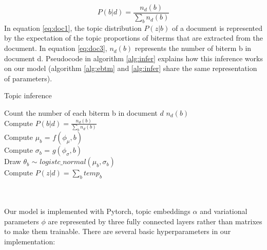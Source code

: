 \begin{equation}
    P(b|d) = \frac{n_d(b)}{\sum_bn_d(b)}
\label{eq:doc3}
\end{equation}
In equation \ref{eq:doc1}, the topic distribution $P(z|b)$ of a document is represented by the expectation of the topic proportions of biterms that are extracted from the document. In equation \ref{eq:doc3}, $n_d(b)$ represents the number of biterm b in document d. Pseudocode in algorithm \ref{alg:infer} explains how this inference works on our model (algorithm \ref{alg:ebtm} and \ref{alg:infer} share the same representation of parameters).
\begin{algorithm}[!htbp]
    \caption{Topic inference}
    \label{alg:infer}
    \LinesNumbered
    Count the number of each biterm b in document $d$ $n_d(b)$\\
    {
        Compute $P(b|d) = \frac{n_d(b)}{\sum_bn_d(b)}$\\
        Compute $\mu_b$ = $f(\phi_{\mu},b)$\\
        Compute $\sigma_b$ = $g(\phi_{\sigma},b)$\\ 
        Draw $\theta_b$ $\sim$ $logistc\_normal(\mu_b,\sigma_b)$\\
    }
    {
        Compute $P(z|d) = \sum_b temp_b$
    }
\end{algorithm}
\\\\Our model is implemented with Pytorch, topic embeddings $\alpha$ and variational parameters $\phi$ are represented by three fully connected layers rather than matrixes to make them trainable. There are several basic hyperparameters in our implementation:
